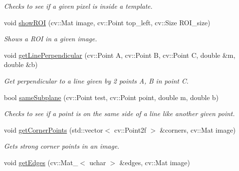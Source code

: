 \begin{DoxyCompactItemize}
\begin{DoxyCompactList}\small\item\em Checks to see if a given pixel is inside a template. \item\end{DoxyCompactList}\item 
\hypertarget{classfeatureDetector_ac76e1c2b278f87000637cdffd1ec7706}{
void \hyperlink{classfeatureDetector_ac76e1c2b278f87000637cdffd1ec7706}{showROI} (cv::Mat image, cv::Point top\_\-left, cv::Size ROI\_\-size)}
\label{classfeatureDetector_ac76e1c2b278f87000637cdffd1ec7706}

\begin{DoxyCompactList}\small\item\em Shows a ROI in a given image. \item\end{DoxyCompactList}\item 
\hypertarget{classfeatureDetector_a08250d6f19b71faa54abbc8d23dfacfc}{
void \hyperlink{classfeatureDetector_a08250d6f19b71faa54abbc8d23dfacfc}{getLinePerpendicular} (cv::Point A, cv::Point B, cv::Point C, double \&m, double \&b)}
\label{classfeatureDetector_a08250d6f19b71faa54abbc8d23dfacfc}

\begin{DoxyCompactList}\small\item\em Get perpendicular to a line given by 2 points A, B in point C. \item\end{DoxyCompactList}\item 
\hypertarget{classfeatureDetector_a527c8b9ba5c24f552555278c8bc91b9b}{
bool \hyperlink{classfeatureDetector_a527c8b9ba5c24f552555278c8bc91b9b}{sameSubplane} (cv::Point test, cv::Point point, double m, double b)}
\label{classfeatureDetector_a527c8b9ba5c24f552555278c8bc91b9b}

\begin{DoxyCompactList}\small\item\em Checks to see if a point is on the same side of a line like another given point. \item\end{DoxyCompactList}\item 
\hypertarget{classfeatureDetector_aba2cd3ee3fe2e756164855429aa9d043}{
void \hyperlink{classfeatureDetector_aba2cd3ee3fe2e756164855429aa9d043}{getCornerPoints} (std::vector$<$ cv::Point2f $>$ \&corners, cv::Mat image)}
\label{classfeatureDetector_aba2cd3ee3fe2e756164855429aa9d043}

\begin{DoxyCompactList}\small\item\em Gets strong corner points in an image. \item\end{DoxyCompactList}\item 
\hypertarget{classfeatureDetector_a7835049294fc18ef75ce49f0b408eca1}{
void \hyperlink{classfeatureDetector_a7835049294fc18ef75ce49f0b408eca1}{getEdges} (cv::Mat\_\-$<$ uchar $>$ \&edges, cv::Mat image)}
\label{classfeatureDetector_a7835049294fc18ef75ce49f0b408eca1}


\end{DoxyCompactItemize}
